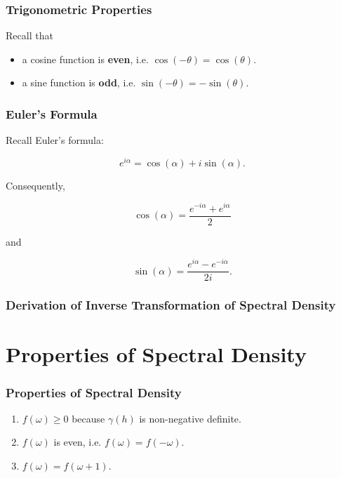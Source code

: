 \documentclass[%
xcolor=pdftex]{beamer}
\begin{document}
\begin{frame}
\frametitle{Trigonometric Properties}

Recall that

\begin{itemize}
\item a cosine function is \textbf{even}, i.e. $\cos(-\theta) = \cos(\theta)$.
\item a sine function is \textbf{odd}, i.e. $\sin(-\theta) = -\sin(\theta)$.
\end{itemize}

\end{frame}

\begin{frame}
\frametitle{Euler's Formula}

Recall Euler's formula:

\begin{equation} \label{eq:euler}
e^{i \alpha} = \cos (\alpha) + i \sin (\alpha).
\end{equation}

Consequently,

\begin{equation} \label{eq:ecos}
\cos(\alpha) = \frac{e^{-i \alpha} + e^{i \alpha}}{2}
\end{equation}

and

\begin{equation} \label{eq:esin}
\sin(\alpha) = \frac{e^{i \alpha} - e^{-i \alpha}}{2i}.
\end{equation}


\end{frame}

\begin{frame}
\frametitle{Derivation of Inverse Transformation of Spectral Density}

\end{frame}



\section{Properties of Spectral Density}
\frame{\tableofcontents[currentsection]}

\begin{frame}
\frametitle{Properties of Spectral Density}

\begin{enumerate}
\item $f(\omega) \geq 0$ because $\gamma(h)$ is non-negative definite.
\item $f(\omega)$ is even, i.e. $f(\omega) = f(-\omega)$.
\item $f(\omega) = f(\omega+1)$.
\end{enumerate}



\end{frame}
\end{document}
